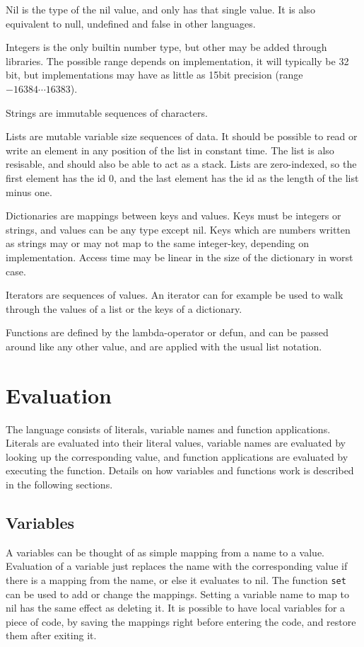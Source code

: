 Nil is the type of the nil value, and only has that single value. It is also equivalent to null, undefined and false in other languages.

Integers is the only builtin number type, but other may be added through libraries. The possible range depends on implementation, it will typically be 32 bit, but implementations may have as little as 15bit precision (range $-16384\cdots 16383$).

Strings are immutable sequences of characters.

Lists are mutable variable size sequences of data. It should be possible to read or write an element in any position of the list in constant time. The list is also resisable, and should also be able to act as a stack. 
Lists are zero-indexed, so the first element has the id 0, and the last element has the id as the length of the list minus one.

Dictionaries are mappings between keys and values. Keys must be integers or strings, and values can be any type except nil. Keys which are numbers written as strings may or may not map to the same integer-key, depending on implementation. Access time may be linear in the size of the dictionary in worst case.

Iterators are sequences of values. An iterator can for example be used to walk through the values of a list or the keys of a dictionary. 

Functions are defined by the lambda-operator or defun, and can be passed around like any other value, and are applied with the usual list notation.

\section{Evaluation}

The language consists of literals, variable names and function applications.
Literals are evaluated into their literal values, 
variable names are evaluated by looking up the corresponding value, and
function applications are evaluated by executing the function.
Details on how variables and functions work is described in the following sections.

\subsection{Variables}

A variables can be thought of as simple mapping from a name to a value.
Evaluation of a variable just replaces the name with the corresponding value if there is a mapping from the name, or else it evaluates to nil.
The function \verb|set| can be used to add or change the mappings. Setting a variable name to map to nil has the same effect as deleting it.
It is possible to have local variables for a piece of code, by saving the mappings right before entering the code, and restore them after exiting it.

